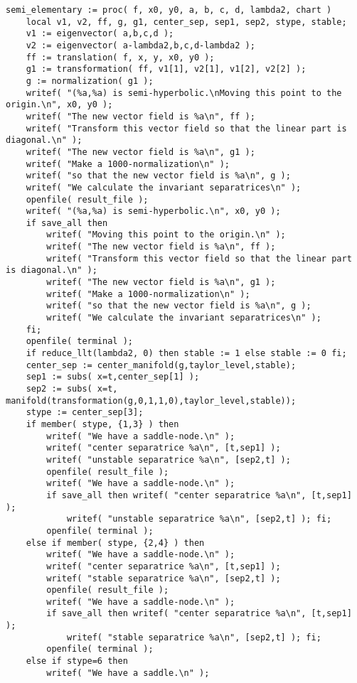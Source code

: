 \documentclass[a4paper,10pt]{article}
\begin{document}
\begin{lstlisting}[name=type]
semi_elementary := proc( f, x0, y0, a, b, c, d, lambda2, chart )
    local v1, v2, ff, g, g1, center_sep, sep1, sep2, stype, stable;
    v1 := eigenvector( a,b,c,d );
    v2 := eigenvector( a-lambda2,b,c,d-lambda2 );
    ff := translation( f, x, y, x0, y0 );
    g1 := transformation( ff, v1[1], v2[1], v1[2], v2[2] );
    g := normalization( g1 );
    writef( "(%a,%a) is semi-hyperbolic.\nMoving this point to the origin.\n", x0, y0 );
    writef( "The new vector field is %a\n", ff );
    writef( "Transform this vector field so that the linear part is diagonal.\n" );
    writef( "The new vector field is %a\n", g1 );
    writef( "Make a 1000-normalization\n" );
    writef( "so that the new vector field is %a\n", g );
    writef( "We calculate the invariant separatrices\n" );
    openfile( result_file );
    writef( "(%a,%a) is semi-hyperbolic.\n", x0, y0 );
    if save_all then
        writef( "Moving this point to the origin.\n" );
        writef( "The new vector field is %a\n", ff );
        writef( "Transform this vector field so that the linear part is diagonal.\n" );
        writef( "The new vector field is %a\n", g1 );
        writef( "Make a 1000-normalization\n" );
        writef( "so that the new vector field is %a\n", g );
        writef( "We calculate the invariant separatrices\n" );
    fi;
    openfile( terminal );
    if reduce_llt(lambda2, 0) then stable := 1 else stable := 0 fi;
    center_sep := center_manifold(g,taylor_level,stable);
    sep1 := subs( x=t,center_sep[1] );
    sep2 := subs( x=t, manifold(transformation(g,0,1,1,0),taylor_level,stable));
    stype := center_sep[3];
    if member( stype, {1,3} ) then
        writef( "We have a saddle-node.\n" );
        writef( "center separatrice %a\n", [t,sep1] );
        writef( "unstable separatrice %a\n", [sep2,t] );
        openfile( result_file );
        writef( "We have a saddle-node.\n" );
        if save_all then writef( "center separatrice %a\n", [t,sep1] );
            writef( "unstable separatrice %a\n", [sep2,t] ); fi;
        openfile( terminal );
    else if member( stype, {2,4} ) then
        writef( "We have a saddle-node.\n" );
        writef( "center separatrice %a\n", [t,sep1] );
        writef( "stable separatrice %a\n", [sep2,t] );
        openfile( result_file );
        writef( "We have a saddle-node.\n" );
        if save_all then writef( "center separatrice %a\n", [t,sep1] );
            writef( "stable separatrice %a\n", [sep2,t] ); fi;
        openfile( terminal );
    else if stype=6 then
        writef( "We have a saddle.\n" );

\end{lstlisting}
\end{document}
